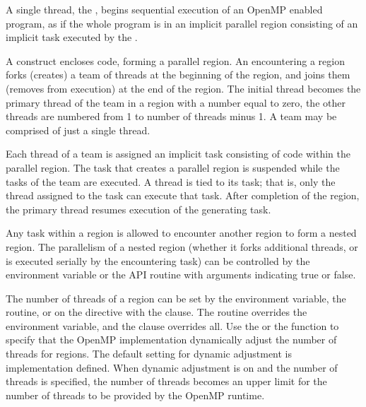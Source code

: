 \label{chap:parallel_execution}

A single thread, the , begins sequential execution of 
an OpenMP enabled program, as if the whole program is in an implicit parallel
region consisting of an implicit task executed by the .

A  construct encloses code, 
forming a parallel region.  An  encountering a  
region forks (creates) a team of threads at the beginning of the 
 region, and joins them (removes from execution) at the 
end of the region.  The initial thread becomes the primary thread of the team in a 
 region with a  number equal to zero, the other 
threads are numbered from 1 to number of threads minus 1. 
A team may be comprised of just a single thread.

Each thread of a team is assigned an implicit task consisting of code within the 
parallel region. The task that creates a parallel region is suspended while the
tasks of the team are executed.  A thread is tied to its task; that is,
only the thread assigned to the task can execute that task.  After completion 
of the  region, the primary thread resumes execution of the generating task.  


Any task within a  region is allowed to encounter another
 region to form a nested  region. The 
parallelism of a nested  region (whether it forks additional 
threads, or is executed serially by the encountering task) can be controlled by the
 environment variable or the  
API routine with arguments indicating true or false.

The number of threads of a  region can be set by the 
environment variable, the  routine, or on the  
directive with the 
clause. The routine overrides the environment variable, and the clause overrides all. 
Use the 
or the  function to specify that the OpenMP
implementation dynamically adjust the number of threads for
 regions.  The default setting for dynamic adjustment is implementation
defined. When dynamic adjustment is on and the number of threads is specified,
the number of threads becomes an upper limit for the number of threads to be
provided by the OpenMP runtime.

